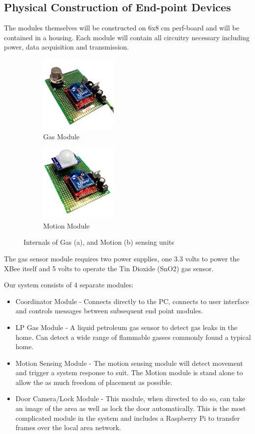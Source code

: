 \documentclass[letter,twocolumn]{report}
\begin{document}
	\subsection{Physical Construction of End-point Devices}
	\par The modules themselves will be constructed on 6x8 cm perf-board and will be contained in a housing. Each module will contain all circuitry necessary including power, data acquisition and transmission. 
	\begin{figure}[h!]
		\centering
		\begin{subfigure}[t]{0.45\textwidth}
			\centering
			\includegraphics[height=1.5in]{module_gas.jpg}
			\caption{Gas Module}
		\end{subfigure}
		\begin{subfigure}[t]{0.45\textwidth}
			\centering
			\includegraphics[height=1.5in]{module_motion.jpg}
			\caption{Motion Module}
		\end{subfigure}
		\caption{Internals of Gas (a), and Motion (b) sensing units}
	\end{figure}
	\par The gas sensor module requires two power supplies, one 3.3 volts to power the XBee itself and 5 volts to operate the Tin Dioxide (SnO2) gas sensor. \\
	\par Our system consists of 4 separate modules:
	\begin{itemize}
		\item Coordinator Module - Connects directly to the PC, connects to user interface and controls messages between subsequent end point modules. 
		\item LP Gas Module - A liquid petroleum gas sensor to detect gas leaks in the home. Can detect a wide range of flammable gasses commonly found a typical home.
		\item Motion Sensing Module - The motion sensing module will detect movement and trigger a system response to suit. The Motion module is stand alone to allow the as much freedom of placement as possible.
		\item Door Camera/Lock Module - This module, when directed to do so, can take an image of the area as well as lock the door automatically. This is the most complicated module in the system and includes a Raspberry Pi to transfer frames over the local area network.
	\end{itemize}
	\onecolumn
\end{document}
